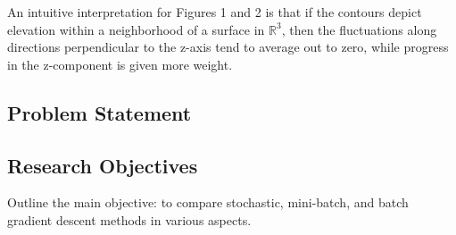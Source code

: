 An intuitive interpretation for Figures 1 and 2 is that if the contours depict elevation within a neighborhood of a surface in $\mathbb{R}^3$, then the fluctuations along directions perpendicular to the z-axis tend to average out to zero, while progress in the z-component is given more weight.



\subsection{Problem Statement}

\subsection{Research Objectives}
Outline the main objective: to compare stochastic, mini-batch, and batch gradient descent methods in various aspects.

